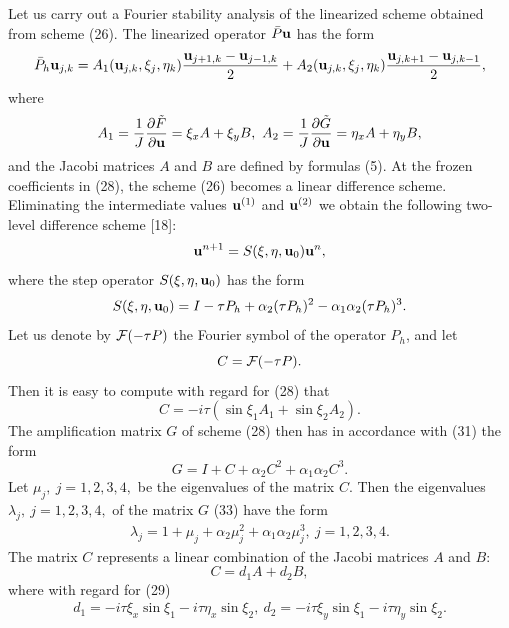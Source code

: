    Let us carry out a Fourier stability analysis of the linearized scheme
obtained from scheme (26). The linearized operator $\bar{P}{\bf u}$ has the
form
\begin{equation}
\bar{P}_h{\bf u}_{j,k}=A_1({\bf u}_{j,k},\xi_j,\eta_k)\frac{{\bf u}_{j+1,k}-
{\bf u}_{j-1,k}}{2} +
A_2({\bf u}_{j,k},\xi_j,\eta_k)\frac{{\bf u}_{j,k+1}-
{\bf u}_{j,k-1}}{2},
\end{equation}
where
\begin{eqnarray}
A_1=\frac{1}{J}\frac{\partial \tilde{F}}{\partial {\bf u}}=\xi_xA+\xi_yB,
~A_2=\frac{1}{J}\frac{\partial \tilde{G}}{\partial {\bf u}}=\eta_xA+\eta_yB,
\end{eqnarray}
and the Jacobi matrices $A$ and $B$ are defined by formulas (5). At the
frozen coefficients in (28), the scheme (26) becomes a linear difference
scheme. Eliminating the intermediate values ${\bf u}^{(1)}$ and ${\bf u}^{(2)}$
we obtain the following two-level difference scheme [18]:
\begin{equation}
{\bf u}^{n+1}=S(\xi,\eta,{\bf u}_0){\bf u}^n,
\end{equation}
where the step operator $S(\xi,\eta,{\bf u}_0)$ has the form
\begin{equation}
S(\xi,\eta,{\bf u}_0)= I - \tau P_h +\alpha_2(\tau P_h)^2 -\alpha_1\alpha_2
(\tau P_h)^3.
\end{equation}
Let us denote by ${\cal F}(-\tau P)$ the Fourier symbol of the operator $P_h$,
and let
$$C={\cal F}(-\tau P).$$
Then it is easy to compute with regard for (28) that
\begin{equation}
C=-i\tau(\sin \xi_1A_1 + \sin \xi_2 A_2).
\end{equation}
The amplification matrix $G$ of scheme (28) then has in accordance with (31)
the form
\begin{equation}
G=I+C+\alpha_2C^2+\alpha_1\alpha_2C^3.
\end{equation}
Let $\mu_j,~j=1,2,3,4,$ be the eigenvalues of the matrix $C$. Then the
eigenvalues $\lambda_j,~j=1,2,3,4,$ of the matrix $G$ (33) have the form
\begin{eqnarray*}
\lambda_j=1+\mu_j+\alpha_2\mu_j^2+\alpha_1\alpha_2\mu_j^3,~j=1,2,3,4.
\end{eqnarray*}
The matrix $C$ represents a linear combination of the Jacobi matrices $A$ and
$B$:
\begin{equation}
C=d_1A+d_2B,
\end{equation}
where with regard for (29)
\begin{eqnarray}
d_1=-i\tau\xi_x\sin \xi_1 - i\tau\eta_x\sin \xi_2,
~d_2=-i\tau\xi_y\sin \xi_1 - i\tau\eta_y\sin \xi_2.
\end{eqnarray}
